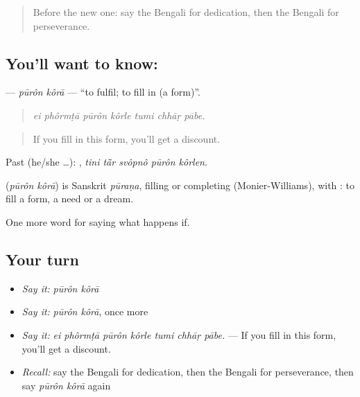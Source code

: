 \label{lesson:BN-C382-puron-kora}



\begin{quote}
Before the new one: say the Bengali for dedication, then the Bengali for perseverance.
\end{quote}

\subsection*{You'll want to know:  }
\textbf{ } — \emph{pūrôn kôrā} — \textquotedblleft{}to fulfil; to fill in (a form)\textquotedblright{}.

\begin{quote}
      
\end{quote}

\begin{quote}
\emph{ei phôrmṭā pūrôn kôrle tumi chhāṛ pābe.}
\end{quote}

\begin{quote}
If you fill in this form, you'll get a discount.
\end{quote}

Past (he/she …):     , \emph{tini tā̃r svôpnô pūrôn kôrlen}.

\begin{cousinweb}
\textbf{ } (\emph{pūrôn kôrā}) is Sanskrit \emph{pūraṇa}, filling or completing (Monier-Williams), with : to fill a form, a need or a dream.
\end{cousinweb}

\begin{grammarlens}[title={What you've built}]
One more word for saying what happens if.
\end{grammarlens}

\subsection*{Your turn}
\begin{itemize}
\raggedright
  \item \emph{Say it:} \emph{pūrôn kôrā}
  \item \emph{Say it:} \emph{pūrôn kôrā}, once more
  \item \emph{Say it:} \emph{ei phôrmṭā pūrôn kôrle tumi chhāṛ pābe.} — If you fill in this form, you'll get a discount.
  \item \emph{Recall:} say the Bengali for dedication, then the Bengali for perseverance, then say \emph{pūrôn kôrā} again
\end{itemize}

